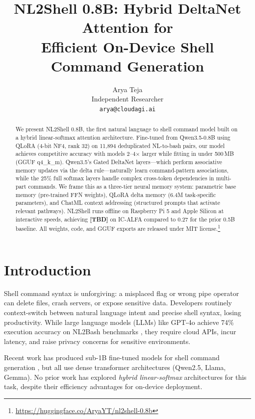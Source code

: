 \documentclass[11pt,a4paper]{article}
\title{NL2Shell 0.8B: Hybrid DeltaNet Attention for \\Efficient On-Device Shell Command Generation}
\author{
  Arya Teja \\
  Independent Researcher \\
  \texttt{arya@cloudagi.ai}
}
\begin{document}
\maketitle

\begin{abstract}
We present NL2Shell 0.8B, the first natural language to shell command model built on a hybrid linear-softmax attention architecture.
Fine-tuned from Qwen3.5-0.8B using QLoRA (4-bit NF4, rank 32) on 11{,}894 deduplicated NL-to-bash pairs, our model achieves competitive accuracy with models 2--4$\times$ larger while fitting in under 500\,MB (GGUF q4\_k\_m).
Qwen3.5's Gated DeltaNet layers---which perform associative memory updates via the delta rule---naturally learn command-pattern associations, while the 25\% full softmax layers handle complex cross-token dependencies in multi-part commands.
We frame this as a three-tier neural memory system: parametric base memory (pre-trained FFN weights), QLoRA delta memory (6.4M task-specific parameters), and ChatML context addressing (structured prompts that activate relevant pathways).
NL2Shell runs offline on Raspberry Pi 5 and Apple Silicon at interactive speeds, achieving \textbf{[TBD]} on IC-ALFA compared to 0.27 for the prior 0.5B baseline.
All weights, code, and GGUF exports are released under MIT license.\footnote{\url{https://huggingface.co/AryaYT/nl2shell-0.8b}}
\end{abstract}

\section{Introduction}

Shell command syntax is unforgiving: a misplaced flag or wrong pipe operator can delete files, crash servers, or expose sensitive data.
Developers routinely context-switch between natural language intent and precise shell syntax, losing productivity.
While large language models (LLMs) like GPT-4o achieve 74\% execution accuracy on NL2Bash benchmarks \cite{westenfelder2025}, they require cloud APIs, incur latency, and raise privacy concerns for sensitive environments.

Recent work has produced sub-1B fine-tuned models for shell command generation \cite{westenfelder2025}, but all use dense transformer architectures (Qwen2.5, Llama, Gemma).
No prior work has explored \emph{hybrid linear-softmax} architectures for this task, despite their efficiency advantages for on-device deployment.
\end{document}
